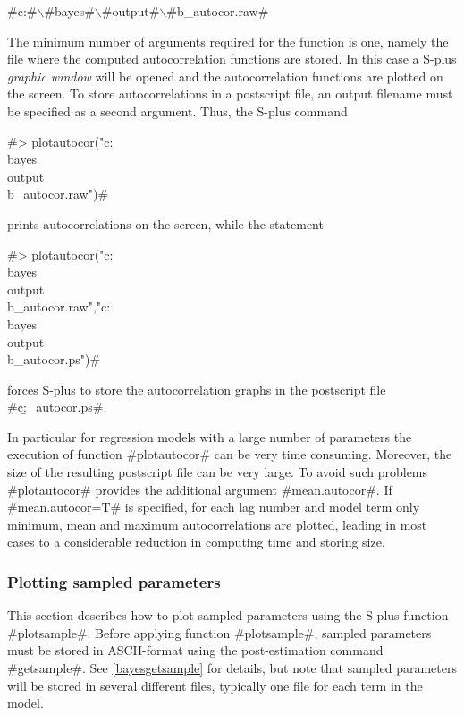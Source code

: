 #c:#$\backslash$#bayes#$\backslash$#output#$\backslash$#b_autocor.raw#

The minimum number of arguments required for the function is one,
namely the file where the computed autocorrelation functions are
stored. In this case a S-plus {\em graphic window} will be opened
and the autocorrelation functions are plotted on the screen. To
store autocorrelations in a postscript file, an output filename
must be specified as a second argument. Thus, the S-plus command

#> plotautocor("c:\\bayes\\output\\b_autocor.raw")#

prints autocorrelations on the screen, while the statement

 #> plotautocor("c:\\bayes\\output\\b_autocor.raw","c:\\bayes\\output\\b_autocor.ps")#

forces S-plus to store the autocorrelation graphs in the
postscript file #c:\bayes\output\b_autocor.ps#.

In particular for regression models with a large number of
parameters the execution of function #plotautocor# can be very
time consuming. Moreover, the size of the resulting postscript
file can be very large. To avoid such problems #plotautocor#
provides the additional argument #mean.autocor#. If
#mean.autocor=T# is specified, for each lag number and model term
only minimum, mean and maximum autocorrelations are plotted,
leading in most cases to a considerable reduction in computing
time and storing size.


\subsubsection{Plotting sampled parameters}
\label{splusplotsample} 

This section describes how to plot sampled parameters using the
S-plus function #plotsample#. Before applying function
#plotsample#, sampled parameters must be stored in ASCII-format
using the post-estimation command #getsample#. See
\autoref{bayesgetsample} for details, but note that sampled
parameters will be stored in several different files, typically
one file for each term in the model.

